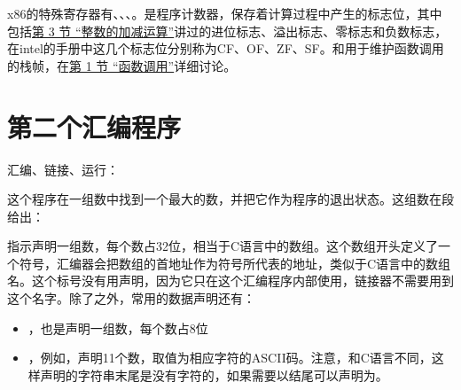 x86的特殊寄存器有、、、。是程序计数器，保存着计算过程中产生的标志位，其中包括\hyperlink{db.ch14s03.id2753602}{第 3 节 “整数的加减运算”}讲过的进位标志、溢出标志、零标志和负数标志，在intel的手册中这几个标志位分别称为CF、OF、ZF、SF。和用于维护函数调用的栈帧，在\hyperlink{db.ch19s01.id2774377}{第 1 节 “函数调用”}详细讨论。




\section{第二个汇编程序}
%



汇编、链接、运行：




这个程序在一组数中找到一个最大的数，并把它作为程序的退出状态。这组数在段给出：




指示声明一组数，每个数占32位，相当于C语言中的数组。这个数组开头定义了一个符号，汇编器会把数组的首地址作为符号所代表的地址，类似于C语言中的数组名。这个标号没有用声明，因为它只在这个汇编程序内部使用，链接器不需要用到这个名字。除了之外，常用的数据声明还有：


\begin{itemize}

\item {}，也是声明一组数，每个数占8位

\item {}，例如，声明11个数，取值为相应字符的ASCII码。注意，和C语言不同，这样声明的字符串末尾是没有字符的，如果需要以结尾可以声明为。
\end{itemize}



